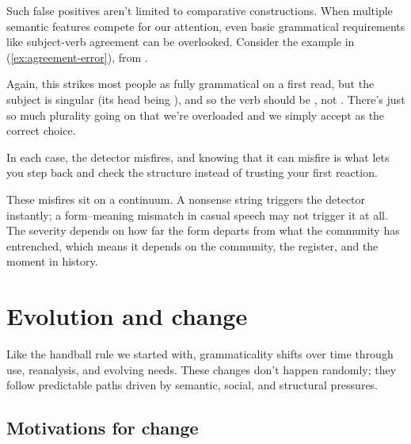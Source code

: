 Such false positives aren't limited to comparative constructions. When multiple semantic features compete for our attention, even basic grammatical requirements like subject-verb agreement can be overlooked. Consider the example in (\ref{ex:agreement-error}), from \citet{corbett2016}.

\label{ex:agreement-error}
\z
Again, this strikes most people as fully grammatical on a first read, but the subject is singular (its head being ), and so the verb should be , not . There's just so much plurality going on that we're overloaded and we simply accept  as the correct choice.

In each case, the detector misfires, and knowing that it can misfire is what lets you step back and check the structure instead of trusting your first reaction.

These misfires sit on a continuum. A nonsense string triggers the detector instantly; a form--meaning mismatch in casual speech may not trigger it at all. The severity depends on how far the form departs from what the community has entrenched, which means it depends on the community, the register, and the moment in history.

\section{Evolution and change}

Like the handball rule we started with, grammaticality shifts over time through use, reanalysis, and evolving needs. These changes don't happen randomly; they follow predictable paths driven by semantic, social, and structural pressures.

\subsection{Motivations for change}

